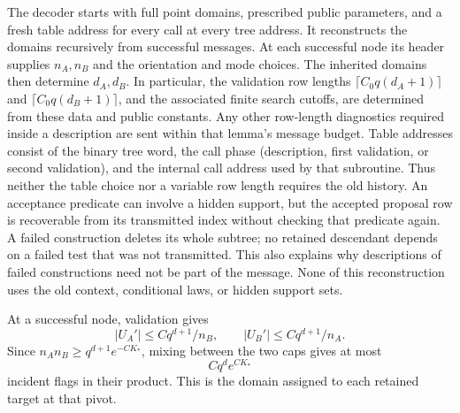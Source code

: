 The decoder starts with full point domains, prescribed
public parameters, and a fresh table address for every
call at every tree address. It reconstructs the domains
recursively from successful messages.
At each successful node its header supplies \(n_A,n_B\)
and the orientation and mode choices. The inherited domains
then determine \(d_A,d_B\). In particular, the validation
row lengths \(\lceil C_0q(d_A+1)\rceil\) and
\(\lceil C_0q(d_B+1)\rceil\), and the associated finite search
cutoffs, are determined from these data and public constants.
Any other row-length diagnostics required inside a
description are sent within that lemma's message budget.
Table addresses consist of the binary tree word, the call
phase (description, first validation, or second validation),
and the internal call address used by that subroutine.
Thus neither the table choice nor a variable row length
requires the old history.
An acceptance predicate can involve a hidden support,
but the accepted proposal row is recoverable from its
transmitted index without checking that predicate again.
A failed construction deletes its whole subtree; no
retained descendant depends on a failed test that was
not transmitted. This also explains why descriptions
of failed constructions need not be part of the message.
None of this reconstruction uses the old context,
conditional laws, or hidden support sets.

At a successful node, validation gives
\[
 |U_A'|\le Cq^{d+1}/n_B,\qquad
 |U_B'|\le Cq^{d+1}/n_A.
\]
Since \(n_An_B\ge q^{d+1}e^{-CK_*}\), mixing between
the two caps gives at most
\begin{equation}\label{comp:new-domain}
 Cq^d e^{CK_*}
\end{equation}
incident flags in their product. This is the domain
assigned to each retained target at that pivot.

